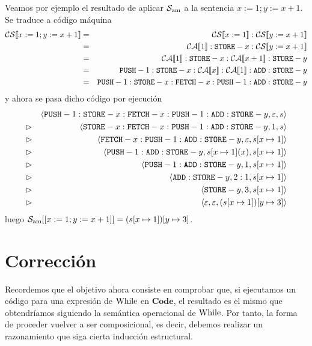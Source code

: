\begin{example} Veamos por ejemplo el resultado de aplicar $ \mathcal{S}_{\mathrm{am}}$ a la sentencia $x:=1; y:= x+1$. Se traduce a código máquina
\begin{eqnarray*}
    \fc{CS}{x:=1; y:= x+1} &=& \fc{CS}{x:=1}: \fc{CS}{y:= x+1} \\
    &=& \fc{CA}{1}:\n{STORE}-x:\fc{CS}{y:= x+1} \\
    &=& \fc{CA}{1}:\n{STORE}-x:\fc{CA}{x+1}:\n{STORE}-y \\
    &=& \n{PUSH}-1:\n{STORE}-x:\fc{CA}{x}:\fc{CA}{1}:\n{ADD}:\n{STORE}-y \\
    &=& \n{PUSH}-1:\n{STORE}-x:\n{FETCH}-x:\n{PUSH}-1:\n{ADD}:\n{STORE}-y
\end{eqnarray*}
y ahora se pasa dicho código por ejecución
\begin{eqnarray*}
    && \langle \texttt{PUSH}-1:\texttt{STORE}-x:\texttt{FETCH}-x:\texttt{PUSH}-1:\texttt{ADD}:\texttt{STORE}-y,  \varepsilon, s \rangle \\
    &\rhd& \langle \texttt{STORE}-x:\texttt{FETCH}-x:\texttt{PUSH}-1:\texttt{ADD}:\texttt{STORE}-y, 1, s \rangle \\
    &\rhd& \langle \texttt{FETCH}-x:\texttt{PUSH}-1:\texttt{ADD}:\texttt{STORE}-y, \varepsilon, s[x\mapsto 1] \rangle\\
    &\rhd& \langle \texttt{PUSH}-1:\texttt{ADD}:\texttt{STORE}-y, s[x\mapsto 1](x), s[x\mapsto 1] \rangle\\
    &\rhd& \langle \texttt{PUSH}-1:\texttt{ADD}:\texttt{STORE}-y, 1, s[x\mapsto 1] \rangle\\
    &\rhd& \langle \texttt{ADD}:\texttt{STORE}-y, 2:1, s[x\mapsto 1] \rangle\\
    &\rhd& \langle \texttt{STORE}-y, 3, s[x\mapsto 1] \rangle\\
    &\rhd& \langle \varepsilon, \varepsilon, (s[x\mapsto 1])[y\mapsto 3] \rangle
\end{eqnarray*}
luego $\mathcal{S}_{\mathrm{am}}[[x:=1; y:= x+1]] = (s[x\mapsto 1])[y\mapsto 3]$.
\end{example}

\section{Corrección}

Recordemos que el objetivo ahora consiste en comprobar que, si ejecutamos un código para una expresión de $\mathrm{While}$ en $\mathbf{Code}$, el resultado es el mismo que obtendríamos siguiendo la semántica operacional de $\mathrm{While}$. Por tanto, la forma de proceder vuelver a ser composicional, es decir, debemos realizar un razonamiento que siga cierta inducción estructural.
\\

